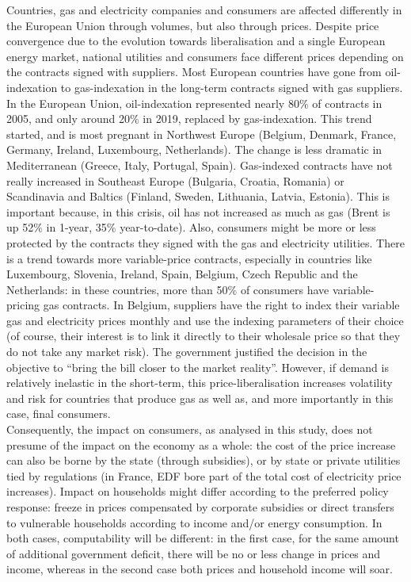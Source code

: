 \documentclass[
  9pt,
  a4paper,
  DIV=11,
  numbers=noendperiod,
  oneside]{scrartcl}
\begin{document}
Countries, gas and electricity companies and consumers are affected
differently in the European Union through volumes, but also through
prices. Despite price convergence due to the evolution towards
liberalisation and a single European energy market, national utilities
and consumers face different prices depending on the contracts signed
with suppliers. Most European countries have gone from oil-indexation to
gas-indexation in the long-term contracts signed with gas suppliers. In
the European Union, oil-indexation represented nearly 80\% of contracts
in 2005, and only around 20\% in 2019, replaced by gas-indexation. This
trend started, and is most pregnant in Northwest Europe (Belgium,
Denmark, France, Germany, Ireland, Luxembourg, Netherlands). The change
is less dramatic in Mediterranean (Greece, Italy, Portugal, Spain).
Gas-indexed contracts have not really increased in Southeast Europe
(Bulgaria, Croatia, Romania) or Scandinavia and Baltics (Finland,
Sweden, Lithuania, Latvia, Estonia). This is important because, in this
crisis, oil has not increased as much as gas (Brent is up 52\% in
1-year, 35\% year-to-date). Also, consumers might be more or less
protected by the contracts they signed with the gas and electricity
utilities. There is a trend towards more variable-price contracts,
especially in countries like Luxembourg, Slovenia, Ireland, Spain,
Belgium, Czech Republic and the Netherlands: in these countries, more
than 50\% of consumers have variable-pricing gas contracts. In Belgium,
suppliers have the right to index their variable gas and electricity
prices monthly and use the indexing parameters of their choice (of
course, their interest is to link it directly to their wholesale price
so that they do not take any market risk). The government justified the
decision in the objective to ``bring the bill closer to the market
reality''. However, if demand is relatively inelastic in the short-term,
this price-liberalisation increases volatility and risk for countries
that produce gas as well as, and more importantly in this case, final
consumers.\\
Consequently, the impact on consumers, as analysed in this study, does
not presume of the impact on the economy as a whole: the cost of the
price increase can also be borne by the state (through subsidies), or by
state or private utilities tied by regulations (in France, EDF bore part
of the total cost of electricity price increases). Impact on households
might differ according to the preferred policy response: freeze in
prices compensated by corporate subsidies or direct transfers to
vulnerable households according to income and/or energy consumption. In
both cases, computability will be different: in the first case, for the
same amount of additional government deficit, there will be no or less
change in prices and income, whereas in the second case both prices and
household income will soar.
\end{document}

